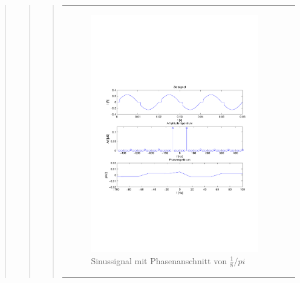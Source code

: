 \begin{quote}
\begin{quote}
\begin{quote}
\begin{center}
\begin{tabular}{ll}
\begin{minipage}{0.6\textwidth}
                        \begin{figure}[H]
                            \label{fig:}
                            \includegraphics[scale=0.5, trim = 1.5cm 7cm 1.5cm 8.5cm,
                            clip]{./Bilder/Phasenanschnitt18pi.pdf}
                            \caption{Sinussignal mit Phasenanschnitt von $\frac{1}{8}/pi$}
                        \end{figure}
                    \vspace{-1.5em}
    
                    \end{minipage}
    
                \end{tabular}
                \end{center}
    

\end{quote}
\end{quote}
\end{quote}
